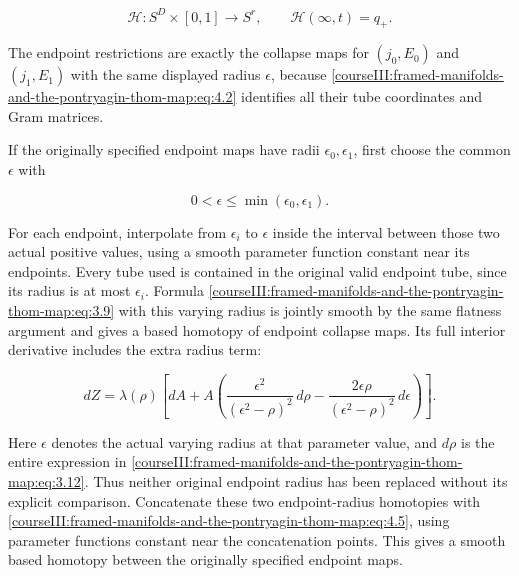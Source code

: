 \begin{equation}
\mathcal H:S^D\times[0,1]\longrightarrow S^r,\qquad
 \mathcal H(\infty,t)=q_+.
 \label{courseIII:framed-manifolds-and-the-pontryagin-thom-map:eq:4.5}
\end{equation}

The endpoint restrictions are exactly the collapse maps for \((j_0,E_0)\) and \((j_1,E_1)\) with the same displayed radius \(\epsilon\), because \eqref{courseIII:framed-manifolds-and-the-pontryagin-thom-map:eq:4.2} identifies all their tube coordinates and Gram matrices.

If the originally specified endpoint maps have radii \(\epsilon_0,\epsilon_1\), first choose the common \(\epsilon\) with

\begin{equation}
0<\epsilon\leq\min(\epsilon_0,\epsilon_1).
 \label{courseIII:framed-manifolds-and-the-pontryagin-thom-map:eq:4.6}
\end{equation}

For each endpoint, interpolate from \(\epsilon_i\) to \(\epsilon\) inside the interval between those two actual positive values, using a smooth parameter function constant near its endpoints. Every tube used is contained in the original valid endpoint tube, since its radius is at most \(\epsilon_i\). Formula \eqref{courseIII:framed-manifolds-and-the-pontryagin-thom-map:eq:3.9} with this varying radius is jointly smooth by the same flatness argument and gives a based homotopy of endpoint collapse maps. Its full interior derivative includes the extra radius term:

\begin{equation}
dZ=\lambda(\rho)\left[
 dA+
 A\left(
 \frac{\epsilon^2}{(\epsilon^2-\rho)^2}\,d\rho
 -\frac{2\epsilon\rho}{(\epsilon^2-\rho)^2}\,d\epsilon
 \right)\right].
 \label{courseIII:framed-manifolds-and-the-pontryagin-thom-map:eq:4.7}
\end{equation}

Here \(\epsilon\) denotes the actual varying radius at that parameter value, and \(d\rho\) is the entire expression in \eqref{courseIII:framed-manifolds-and-the-pontryagin-thom-map:eq:3.12}. Thus neither original endpoint radius has been replaced without its explicit comparison. Concatenate these two endpoint-radius homotopies with \eqref{courseIII:framed-manifolds-and-the-pontryagin-thom-map:eq:4.5}, using parameter functions constant near the concatenation points. This gives a smooth based homotopy between the originally specified endpoint maps.

